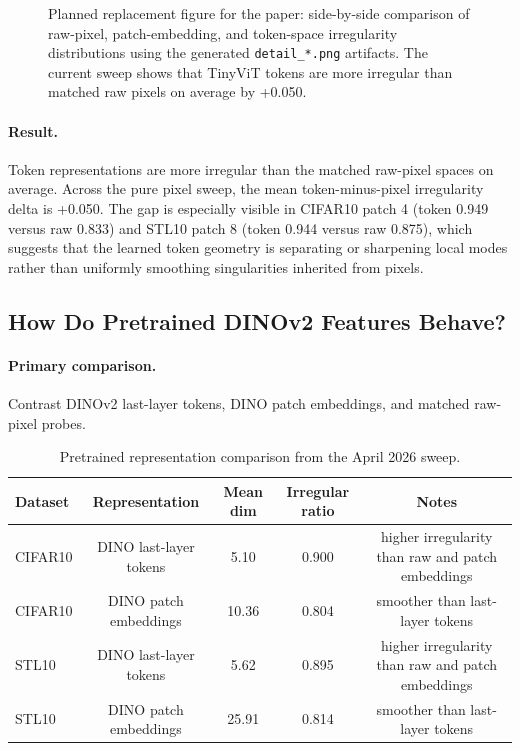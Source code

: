 \documentclass{article}
\newcommand{\dataset}[1]{\textsc{#1}}
\theoremstyle{definition}
\theoremstyle{plain}
\theoremstyle{remark}
\begin{document}
\begin{figure}[H]
\centering
\fbox{\rule{0pt}{2in}\rule{0.95\linewidth}{0pt}}
\caption{Planned replacement figure for the paper: side-by-side comparison of raw-pixel, patch-embedding, and token-space irregularity distributions using the generated \texttt{detail\_*.png} artifacts. The current sweep shows that TinyViT tokens are more irregular than matched raw pixels on average by +0.050.}
\label{fig:token-vs-pixel}
\end{figure}

\paragraph{Result.}
Token representations are more irregular than the matched raw-pixel spaces on average. Across the pure pixel sweep, the mean token-minus-pixel irregularity delta is +0.050. The gap is especially visible in \dataset{CIFAR10} patch 4 (token 0.949 versus raw 0.833) and \dataset{STL10} patch 8 (token 0.944 versus raw 0.875), which suggests that the learned token geometry is separating or sharpening local modes rather than uniformly smoothing singularities inherited from pixels.

\subsection{How Do Pretrained DINOv2 Features Behave?}
\paragraph{Primary comparison.}
Contrast DINOv2 last-layer tokens, DINO patch embeddings, and matched raw-pixel probes.

\begin{table}[H]
\centering
\caption{Pretrained representation comparison from the April 2026 sweep.}
\begin{tabular}{lcccc}
\toprule
Dataset & Representation & Mean dim & Irregular ratio & Notes \\
\midrule
CIFAR10 & DINO last-layer tokens & 5.10 & 0.900 & higher irregularity than raw and patch embeddings \\
CIFAR10 & DINO patch embeddings & 10.36 & 0.804 & smoother than last-layer tokens \\
STL10 & DINO last-layer tokens & 5.62 & 0.895 & higher irregularity than raw and patch embeddings \\
STL10 & DINO patch embeddings & 25.91 & 0.814 & smoother than last-layer tokens \\
\bottomrule
\end{tabular}
\label{tab:pretrained-results}
\end{table}
\end{document}
